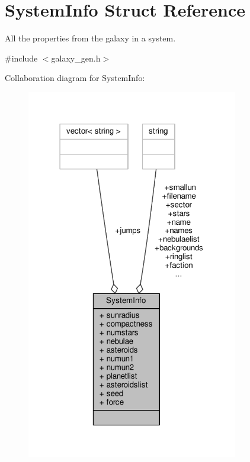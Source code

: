 \hypertarget{structSystemInfo}{}\section{System\+Info Struct Reference}
\label{structSystemInfo}


All the properties from the galaxy in a system.  




{\ttfamily \#include $<$galaxy\+\_\+gen.\+h$>$}



Collaboration diagram for System\+Info\+:
\nopagebreak
\begin{figure}[H]
\begin{center}
\leavevmode
\includegraphics[width=262pt]{d1/db7/structSystemInfo__coll__graph}
\end{center}
\end{figure}
